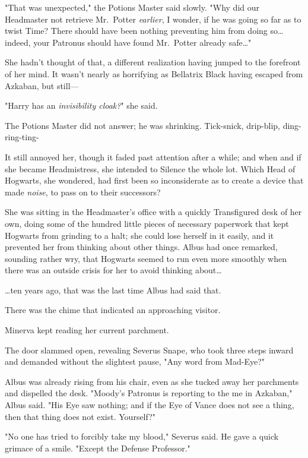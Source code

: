 "That was unexpected," the Potions Master said slowly. "Why did our Headmaster 
not retrieve Mr.~Potter \emph{earlier}, I wonder, if he was going so far as to 
twist Time? There should have been nothing preventing him from doing so{\ldots} 
indeed, your Patronus should have found Mr.~Potter already safe{\ldots}"

She hadn't thought of that, a different realization having jumped to the 
forefront of her mind. It wasn't nearly as horrifying as Bellatrix Black having 
escaped from Azkaban, but still---

"Harry has an \emph{invisibility cloak?}" she said.

The Potions Master did not answer; he was shrinking.
\sbreak
Tick-snick, drip-blip, ding-ring-ting-

It still annoyed her, though it faded past attention after a while; and when 
and if she became Headmistress, she intended to Silence the whole lot. Which 
Head of Hogwarts, she wondered, had first been so inconsiderate as to create a 
device that made \emph{noise}, to pass on to their successors?

She was sitting in the Headmaster's office with a quickly Transfigured desk of 
her own, doing some of the hundred little pieces of necessary paperwork that 
kept Hogwarts from grinding to a halt; she could lose herself in it easily, and 
it prevented her from thinking about other things. Albus had once remarked, 
sounding rather wry, that Hogwarts seemed to run even more smoothly when there 
was an outside crisis for her to avoid thinking about{\ldots}

{\ldots}ten years ago, that was the last time Albus had said that.

There was the chime that indicated an approaching visitor.

Minerva kept reading her current parchment.

The door slammed open, revealing Severus Snape, who took three steps inward and 
demanded without the slightest pause, "Any word from Mad-Eye?"

Albus was already rising from his chair, even as she tucked away her parchments 
and dispelled the desk. "Moody's Patronus is reporting to the me in Azkaban," 
Albus said. "His Eye saw nothing; and if the Eye of Vance does not see a thing, 
then that thing does not exist. Yourself?"

"No one has tried to forcibly take my blood," Severus said. He gave a quick 
grimace of a smile. "Except the Defense Professor."

